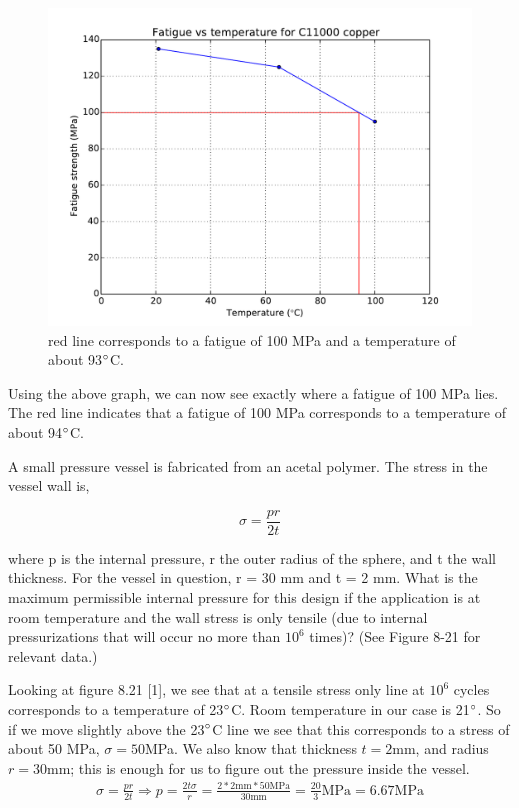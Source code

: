 \documentclass[12pt]{article}
\newenvironment{problem}[2][Problem]{\begin{trivlist}
\item[\hskip \labelsep {\bfseries #1}\hskip \labelsep {\bfseries #2.}]}{\end{trivlist}}
\begin{document}
\begin{figure}[H]
\centering
\includegraphics[width=350pt]{p4.pdf}
\caption{red line corresponds to a fatigue of 100 MPa and a temperature of about 93$\degree$C.}
\end{figure}

Using the above graph, we can now see exactly where a fatigue of 100 MPa lies. The red line indicates that a fatigue of 100 MPa corresponds to a temperature of about 94$\degree$C.

\begin{problem}{8.31}
A small pressure vessel is fabricated from an acetal polymer.  The stress in the vessel wall is,
\begin{centering}
\begin{equation}
\sigma = \frac{pr}{2t}
\end{equation}
\end{centering}
where p is the internal pressure, r the outer radius of the sphere, and t the wall thickness.  For the vessel in question, r = 30 mm and t = 2 mm.  What is the maximum permissible internal pressure for this design if the application is at room temperature and the wall stress is only tensile (due to internal pressurizations that will occur no more than $10^6$ times)?  (See Figure 8-21 for relevant data.) 
\end{problem}

Looking at figure 8.21 [1], we see that at a tensile stress only line at $10^6$ cycles corresponds to a temperature of 23$\degree$C. Room temperature in our case is 21$\degree$. So if we move slightly above the 23$\degree$C line we see that this corresponds to a stress of about 50 MPa, $\sigma = 50$MPa. We also know that thickness $t = 2$mm, and radius $r = 30$mm; this is enough for us to figure out the pressure inside the vessel. 
\begin{align*}
\sigma = \frac{pr}{2t} \Rightarrow p = \frac{2t\sigma}{r} = \frac{2*2\text{mm}*50\text{MPa}}{30\text{mm}} = \frac{20}{3}\text{MPa} = 6.67\text{MPa}
\end{align*}
\end{document}
